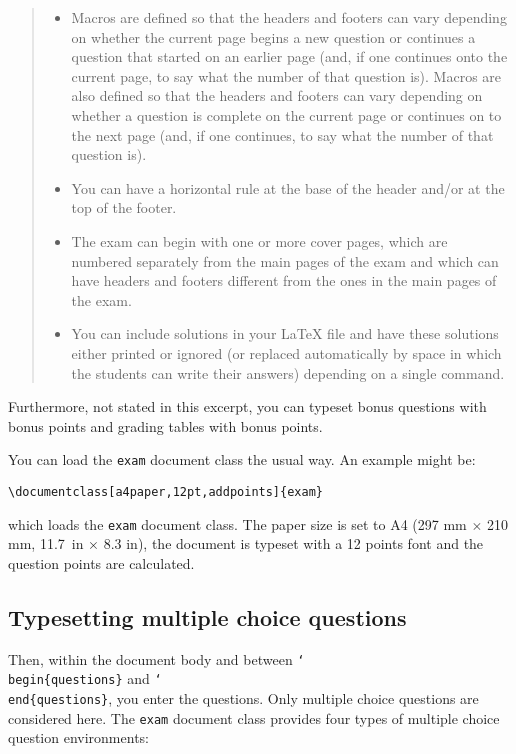 \documentclass[12pt,a4paper]{exam}
\providecommand{\texorpdfstring}[2]{#1}
\newcommand{\bs}{\texorpdfstring{\char`\\}{}}
\begin{document}
\begin{quote}
\begin{itemize}
\item Macros are defined so that the headers and footers can vary
  depending on whether the current page begins a new question or
  continues a question that started on an earlier page (and, if one
  continues onto the current page, to say what the number of that
  question is).  Macros are also defined so that the headers and
  footers can vary depending on whether a question is complete on the
  current page or continues on to the next page (and, if one
  continues, to say what the number of that question is).
\item You can have a horizontal rule at the base of the header and/or
  at the top of the footer.
\item The exam can begin with one or more cover pages, which are
  numbered separately from the main pages of the exam and which can
  have headers and footers different from the ones in the main pages
  of the exam.
\item You can include solutions in your \LaTeX{} file and have these
  solutions either printed or ignored (or replaced automatically by
  space in which the students can write their answers) depending on a
  single command.
\end{itemize}
\end{quote}

Furthermore, not stated in this excerpt, you can typeset bonus questions
with bonus points and grading tables with bonus points.

You can load the \texttt{exam} document class the usual way. An example
might be:

\begin{lstlisting}
\documentclass[a4paper,12pt,addpoints]{exam}
\end{lstlisting}

which loads the \texttt{exam} document class. The paper size is set to
A4 (297 mm $\times$ 210 mm, 11.7~in $\times$ 8.3 in), the document is
typeset with a 12 points font and the question points are calculated.


\subsection{Typesetting multiple choice questions}
Then, within the document body and between \texttt{\bs begin\{questions\}} and
\texttt{\bs end\{questions\}}, you enter the questions. Only multiple choice
questions are considered here. The \texttt{exam} document class provides four types
of multiple choice question environments:
\end{document}
